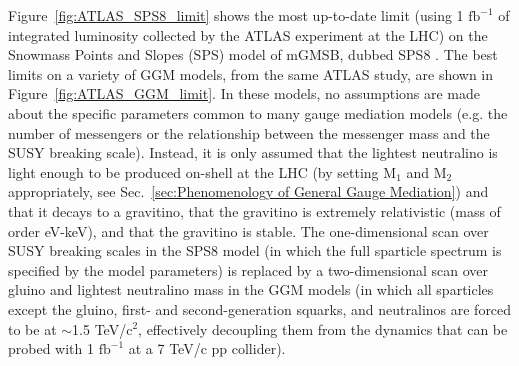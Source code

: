 \documentclass[dissertation.tex]{subfiles}
\begin{document}
Figure~\ref{fig:ATLAS_SPS8_limit} shows the most up-to-date limit (using 1 $\mbox{fb}^{-1}$ of integrated luminosity collected by the ATLAS experiment \cite{ATLAS} at the LHC) on the Snowmass Points and Slopes (SPS) model of mGMSB, dubbed SPS8 \cite{SPS}.  The best limits on a variety of GGM models, from the same ATLAS study, are shown in Figure~\ref{fig:ATLAS_GGM_limit}.  In these models, no assumptions are made about the specific parameters common to many gauge mediation models (e.g. the number of messengers or the relationship between the messenger mass and the SUSY breaking scale).  Instead, it is only assumed that the lightest neutralino is light enough to be produced on-shell at the LHC (by setting $\mbox{M}_{1}$ and $\mbox{M}_{2}$ appropriately, see Sec.~\ref{sec:Phenomenology of General Gauge Mediation}) and that it decays to a gravitino, that the gravitino is extremely relativistic (mass of order eV-keV), and that the gravitino is stable.  The one-dimensional scan over SUSY breaking scales in the SPS8 model (in which the full sparticle spectrum is specified by the model parameters) is replaced by a two-dimensional scan over gluino and lightest neutralino mass in the GGM models (in which all sparticles except the gluino, first- and second-generation squarks, and neutralinos are forced to be at $\sim$1.5 TeV/$\mbox{c}^{2}$, effectively decoupling them from the dynamics that can be probed with 1 $\mbox{fb}^{-1}$ at a 7 TeV/c pp collider).
\end{document}
